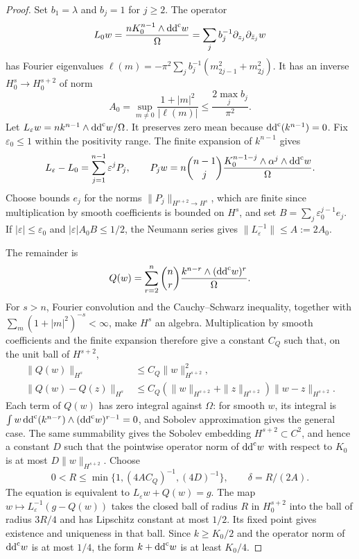 \begin{proof}
Set $b_1=\lambda$ and $b_j=1$ for $j\geq2$. The operator
\[
 L_0w=\frac{nK_0^{n-1}\wedge\mathrm{dd}^{\mathrm{c}} w}{\Omega}
     =\sum_j b_j^{-1}\partial_{z_j}\partial_{\bar z_j}w
\]
has Fourier eigenvalues $\ell(m)=-\pi^2\sum_jb_j^{-1}(m_{2j-1}^2+m_{2j}^2)$. It has an inverse $H^s_0\to H^{s+2}_0$ of norm
\[
 A_0=\sup_{m\ne0}\frac{1+|m|^2}{|\ell(m)|}
       \leq\frac{2\max_jb_j}{\pi^2}.
\]
Let $L_\varepsilon w=nk^{n-1}\wedge\mathrm{dd}^{\mathrm{c}} w/\Omega$. It preserves zero mean because $\mathrm{dd}^{\mathrm{c}}(k^{n-1})=0$. Fix $\varepsilon_0\leq1$ within the positivity range. The finite expansion of $k^{n-1}$ gives
\[
 L_\varepsilon-L_0=\sum_{j=1}^{n-1}\varepsilon^jP_j,
 \qquad P_jw=n\binom{n-1}{j}
    \frac{K_0^{n-1-j}\wedge\alpha^j\wedge\mathrm{dd}^{\mathrm{c}} w}{\Omega}.
\]
Choose bounds $e_j$ for the norms $\|P_j\|_{H^{s+2}\to H^s}$, which are finite since multiplication by smooth coefficients is bounded on $H^s$, and set $B=\sum_j\varepsilon_0^{j-1}e_j$. If $|\varepsilon|\leq\varepsilon_0$ and $|\varepsilon|A_0B\leq1/2$, the Neumann series gives $\|L_\varepsilon^{-1}\|\leq A:=2A_0$.

The remainder is
\[
 Q(w)=\sum_{r=2}^n\binom nr\frac{k^{n-r}\wedge(\mathrm{dd}^{\mathrm{c}} w)^r}{\Omega}.
\]
For $s>n$, Fourier convolution and the Cauchy--Schwarz inequality, together with $\sum_m(1+|m|^2)^{-s}<\infty$, make $H^s$ an algebra. Multiplication by smooth coefficients and the finite expansion therefore give a constant $C_Q$ such that, on the unit ball of $H^{s+2}$,
\[
 \begin{aligned}
 \|Q(w)\|_{H^s}&\leq C_Q\|w\|_{H^{s+2}}^2,\\
 \|Q(w)-Q(z)\|_{H^s}&\leq C_Q(\|w\|_{H^{s+2}}+\|z\|_{H^{s+2}})\|w-z\|_{H^{s+2}}.
 \end{aligned}
\]
Each term of $Q(w)$ has zero integral against $\Omega$: for smooth $w$, its integral is $\int w\,\mathrm{dd}^{\mathrm{c}}(k^{n-r})\wedge(\mathrm{dd}^{\mathrm{c}} w)^{r-1}=0$, and Sobolev approximation gives the general case. The same summability gives the Sobolev embedding $H^{s+2}\subset C^2$, and hence a constant $D$ such that the pointwise operator norm of $\mathrm{dd}^{\mathrm{c}} w$ with respect to $K_0$ is at most $D\|w\|_{H^{s+2}}$. Choose
\begin{equation}\label{eq:cuspidal-contraction-radius}
 0<R\leq\min\{1,(4AC_Q)^{-1},(4D)^{-1}\},\qquad \delta=R/(2A).
\end{equation}
The equation is equivalent to $L_\varepsilon w+Q(w)=g$. The map $w\mapsto L_\varepsilon^{-1}(g-Q(w))$ takes the closed ball of radius $R$ in $H^{s+2}_0$ into the ball of radius $3R/4$ and has Lipschitz constant at most $1/2$. Its fixed point gives existence and uniqueness in that ball. Since $k\geq K_0/2$ and the operator norm of $\mathrm{dd}^{\mathrm{c}} w$ is at most $1/4$, the form $k+\mathrm{dd}^{\mathrm{c}} w$ is at least $K_0/4$.
\end{proof}

